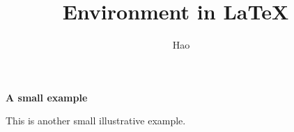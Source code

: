 \documentclass[a4paper,10pt]{article}
\title{Environment in \LaTeX\ }
\author{Hao}
\begin{document}
\maketitle

\begin{huge}
\bfseries
A small example

\end{huge}
\bigskip
This is another small illustrative example.
\end{document}
